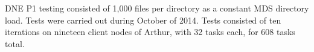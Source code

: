 \documentclass[conference,compsoc]{IEEEtran}
\begin{document}
DNE P1 testing consisted of 1,000 files per directory as a constant MDS
directory load. Tests were carried out during October of 2014. Tests consisted of ten
iterations on nineteen client nodes of Arthur, with 32 tasks each, for 608 tasks total.


%
%
\end{document}
